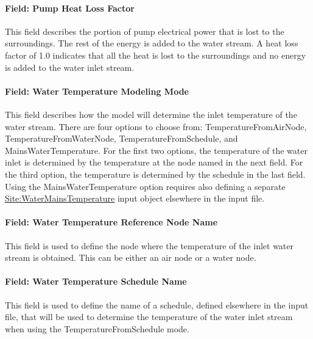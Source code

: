 \paragraph{Field: Pump Heat Loss Factor}\label{field-pump-heat-loss-factor}

This field describes the portion of pump electrical power that is lost to the surroundings. The rest of the energy is added to the water stream. A heat loss factor of 1.0 indicates that all the heat is lost to the surroundings and no energy is added to the water inlet stream.

\paragraph{Field: Water Temperature Modeling Mode}\label{field-water-temperature-modeling-mode}

This field describes how the model will determine the inlet temperature of the water stream. There are four options to choose from: TemperatureFromAirNode, TemperatureFromWaterNode, TemperatureFromSchedule, and MainsWaterTemperature. For the first two options, the temperature of the water inlet is determined by the temperature at the node named in the next field. For the third option, the temperature is determined by the schedule in the last field. Using the MainsWaterTemperature option requires also defining a separate \hyperref[sitewatermainstemperature]{Site:WaterMainsTemperature} input object elsewhere in the input file.

\paragraph{Field: Water Temperature Reference Node Name}\label{field-water-temperature-reference-node-name}

This field is used to define the node where the temperature of the inlet water stream is obtained. This can be either an air node or a water node.

\paragraph{Field: Water Temperature Schedule Name}\label{field-water-temperature-schedule-name}

This field is used to define the name of a schedule, defined elsewhere in the input file, that will be used to determine the temperature of the water inlet stream when using the TemperatureFromSchedule mode.

